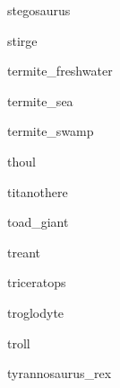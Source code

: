 \documentclass[letterpaper,serif]{module}
\begin{document}
\begin{newmonster}{stegosaurus}\end{newmonster}

\begin{newmonster}{stirge}\end{newmonster}

\begin{newmonster}{termite_freshwater}\end{newmonster}

\begin{newmonster}{termite_sea}\end{newmonster}

\begin{newmonster}{termite_swamp}\end{newmonster}

\begin{newmonster}{thoul}\end{newmonster}

\begin{newmonster}{titanothere}\end{newmonster}

\begin{newmonster}{toad_giant}\end{newmonster}

\begin{newmonster}{treant}\end{newmonster}

\begin{newmonster}{triceratops}\end{newmonster}

\begin{newmonster}{troglodyte}\end{newmonster}

\begin{newmonster}{troll}\end{newmonster}

\begin{newmonster}{tyrannosaurus_rex}\end{newmonster}
\end{document}
